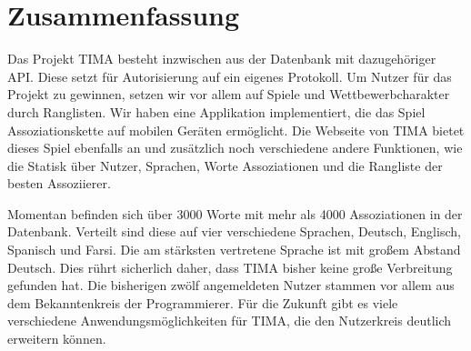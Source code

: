 \chapter{Zusammenfassung}
Das Projekt TIMA besteht inzwischen aus der Datenbank mit dazugehöriger API. Diese setzt für Autorisierung auf ein eigenes Protokoll. Um Nutzer für das Projekt zu gewinnen, setzen wir vor allem auf Spiele und Wettbewerbcharakter durch Ranglisten. Wir haben eine Applikation implementiert, die das Spiel Assoziationskette auf mobilen Geräten ermöglicht. Die Webseite von TIMA bietet dieses Spiel ebenfalls an und zusätzlich noch verschiedene andere Funktionen, wie die Statisk über Nutzer, Sprachen, Worte Assoziationen und die Rangliste der besten Assoziierer.
\newline

Momentan befinden sich über 3000 Worte mit mehr als 4000 Assoziationen in der Datenbank. Verteilt sind diese auf vier verschiedene Sprachen, Deutsch, Englisch, Spanisch und Farsi. Die am stärksten vertretene Sprache ist mit großem Abstand Deutsch. Dies rührt sicherlich daher, dass TIMA bisher keine große Verbreitung gefunden hat. Die bisherigen zwölf angemeldeten Nutzer stammen vor allem aus dem Bekanntenkreis der Programmierer. Für die Zukunft gibt es viele verschiedene Anwendungsmöglichkeiten für TIMA, die den Nutzerkreis deutlich erweitern können.